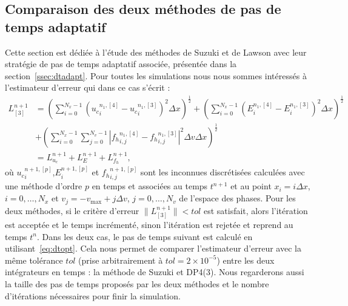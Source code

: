 \FloatBarrier

\subsection{Comparaison des deux méthodes de pas de temps adaptatif}
\label{ssec:2:dtn}

Cette section est dédiée à l'étude des méthodes de Suzuki et de Lawson avec leur stratégie de pas de temps adaptatif associée, présentée dans la section~\ref{ssec:dtadapt}. Pour toutes les simulations nous nous sommes intéressés à l'estimateur d'erreur qui dans ce cas s'écrit :
\begin{equation}
  \begin{aligned}
    L^{n+1}_{[3]} & = \left(\sum_{i=0}^{N_x-1}\left( {u_c}_i^{n_1,[4]}-{u_c}_i^{n_1,[3]} \right)^2\Delta x\right)^{\frac{1}{2}}
                    + \left(\sum_{i=0}^{N_x-1}\left( {E}_i^{n_1,[4]}-{E}_i^{n_1,[3]} \right)^2\Delta x\right)^{\frac{1}{2}} \\
                  & + \left(\sum_{i=0}^{N_x-1}\sum_{j=0}^{N_v-1}\left| {f_h}_{i,j}^{n_1,[4]}-{f_h}_{i,j}^{n_1,[3]} \right|^2\Delta v\Delta x\right)^{\frac{1}{2}} \\
                  & = L_{u_c}^{n+1} + L_{E}^{n+1} + L_{f_h}^{n+1},
  \end{aligned}
  \label{eq:LucEfh:localerror}
\end{equation}
où ${u_c}_i^{n+1,[p]}$,${E}_i^{n+1,[p]}$ et ${f_h}_{i,j}^{n+1,[p]}$ sont les inconnues discrétisées calculées avec une méthode d'ordre $p$ en temps et associées au temps $t^{n+1}$ et au point $x_i=i\Delta x$, $i=0,\dots,N_x$ et $v_j = -v_\text{max} + j\Delta v$, $j=0,\dots,N_v$ de l'espace des phases. Pour les deux méthodes, si le critère d'erreur $\|L_{[3]}^{n+1}\|<tol$ est satisfait, alors l'itération est acceptée et le temps incrémenté, sinon l'itération est rejetée et reprend au temps $t^n$. Dans les deux cas, le pas de temps suivant est calculé en utilisant~\eqref{eq:dtopt}. Cela nous permet de comparer l'estimateur d'erreur avec la même tolérance $tol$ (prise arbitrairement à $tol=2\times10^{-5}$) entre les deux intégrateurs en temps : la méthode de Suzuki et DP4(3). Nous regarderons aussi la taille des pas de temps proposés par les deux méthodes et le nombre d'itérations nécessaires pour finir la simulation.

